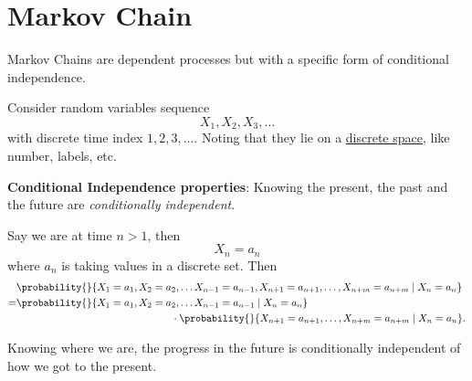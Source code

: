 \section{Markov Chain}
Markov Chains are dependent processes but with a specific form of conditional independence.

Consider random variables sequence
\[
	X_1, X_2, X_3, \ldots
\]
with discrete time index \(1, 2, 3, \ldots \). Noting that they lie on a \underline{discrete space}, like number, labels, etc.

\begin{note}
	\textbf{Conditional Independence properties}: Knowing the present, the past and the future are \emph{conditionally independent}.
\end{note}

Say we are at time \(n>1\), then
\[
	X_n = a_n
\]
where \(a_n\) is taking values in a discrete set. Then
	{\small
		\[
			\begin{split}
				&\probability{}{X_1 = a_1, X_2 = a_2,  \ldots X_{n-1} = a_{n-1}, X_{n+1} = a_{n+1},\ldots , X_{n+m} = a_{n+m}  \mid X_n = a_n }\\
				=&\probability{}{X_1 = a_1, X_2 = a_2,  \ldots X_{n-1} = a_{n-1}\mid X_n = a_n }\\
				&\qquad\qquad\qquad\qquad\qquad\qquad\qquad\quad\cdot \probability{}{X_{n+1} = a_{n+1},\ldots , X_{n+m} = a_{n+m}  \mid X_n = a_n}.
			\end{split}
		\]
	}

\begin{intuition}
	Knowing where we are, the progress in the future is conditionally independent of how we got to the present.
\end{intuition}

